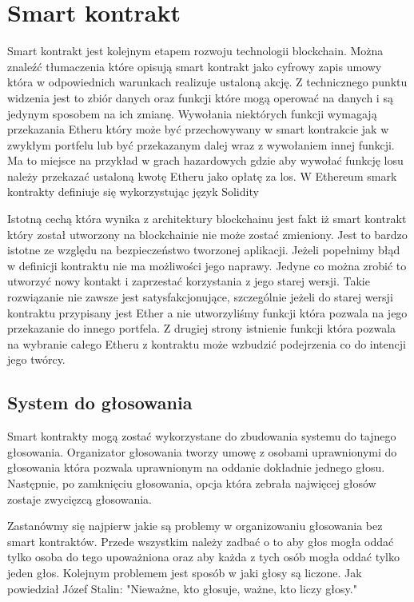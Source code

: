 \documentclass[]{llncs}
\begin{document}
\section{Smart kontrakt}

  Smart kontrakt jest kolejnym etapem rozwoju technologii blockchain. Można
  znaleźć tłumaczenia które opisują smart kontrakt jako cyfrowy zapis umowy
  która w odpowiednich warunkach realizuje ustaloną akcję. Z technicznego punktu
  widzenia jest to zbiór danych oraz funkcji które mogą operować na danych i są
  jedynym sposobem na ich zmianę. Wywołania niektórych funkcji wymagają
  przekazania Etheru który może być przechowywany w smart kontrakcie jak w
  zwykłym portfelu lub być przekazanym dalej wraz z wywołaniem innej funkcji. Ma
  to miejsce na przykład w grach hazardowych gdzie aby wywołać funkcję losu
  należy przekazać ustaloną kwotę Etheru jako opłatę za los. W Ethereum smark
  kontrakty definiuje się wykorzystując język Solidity\cite{solidity}

  Istotną cechą która wynika z architektury blockchainu jest fakt iż smart
  kontrakt który został utworzony na blockchainie nie może zostać zmieniony.
  Jest to bardzo istotne ze względu na bezpieczeństwo tworzonej aplikacji.
  Jeżeli popełnimy błąd w definicji kontraktu nie ma możliwości jego naprawy.
  Jedyne co można zrobić to utworzyć nowy kontakt i zaprzestać korzystania z
  jego starej wersji. Takie rozwiązanie nie zawsze jest satysfakcjonujące,
  szczególnie jeżeli do starej wersji kontraktu przypisany jest Ether a nie
  utworzyliśmy funkcji która pozwala na jego przekazanie do innego portfela. Z
  drugiej strony istnienie funkcji która pozwala na wybranie całego Etheru z
  kontraktu może wzbudzić podejrzenia co do intencji jego twórcy.

\subsection{System do głosowania}

  Smart kontrakty mogą zostać wykorzystane do zbudowania systemu do tajnego
  głosowania. Organizator głosowania tworzy umowę z osobami uprawnionymi do
  głosowania która pozwala uprawnionym na oddanie dokładnie jednego głosu.
  Następnie, po zamknięciu głosowania, opcja która zebrała najwięcej głosów
  zostaje zwycięzcą głosowania.

  Zastanówmy się najpierw jakie są problemy w organizowaniu głosowania bez smart
  kontraktów. Przede wszystkim należy zadbać o to aby głos mogła oddać tylko
  osoba do tego upoważniona oraz aby każda z tych osób mogła oddać tylko jeden
  głos. Kolejnym problemem jest sposób w jaki głosy są liczone. Jak powiedział
  Józef Stalin: "Nieważne, kto głosuje, ważne, kto liczy głosy."
\end{document}
